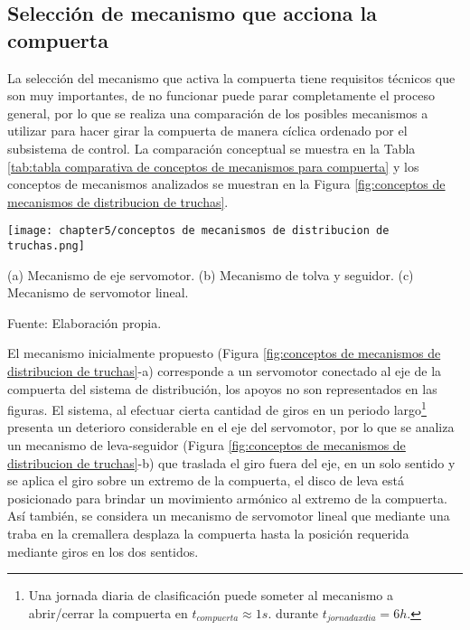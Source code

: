 \vspace{-2.0em}

\subsection{Selección de mecanismo que acciona la compuerta}
	
La selección del mecanismo que activa la compuerta tiene requisitos técnicos que son muy importantes, de no funcionar puede parar completamente el proceso general, por lo que se realiza una comparación de los posibles mecanismos a utilizar para hacer girar la compuerta de manera cíclica ordenado por el subsistema de control. La comparación conceptual se muestra en la Tabla \ref{tab:tabla comparativa de conceptos de mecanismos para compuerta} y los conceptos de mecanismos analizados se muestran en la Figura \ref{fig:conceptos de mecanismos de distribucion de truchas}.
	
\begin{myfigure}[H]
	\footnotesize\centering
	\texttt{[image: chapter5/conceptos de mecanismos de distribucion de truchas.png]}
	\caption[Conceptos de mecanismos de distribución de truchas]{(a) Mecanismo de eje servomotor. (b) Mecanismo de tolva y seguidor. (c) Mecanismo de servomotor lineal.}
	\begin{myflushcenter}
		Fuente: Elaboración propia.
	\end{myflushcenter}
	\label{fig:conceptos de mecanismos de distribucion de truchas}
\end{myfigure}
	
El mecanismo inicialmente propuesto (Figura \ref{fig:conceptos de mecanismos de distribucion de truchas}-a) corresponde a un servomotor conectado al eje de la compuerta del sistema de distribución, los apoyos no son representados en las figuras. El sistema, al efectuar cierta cantidad de giros en un periodo largo\footnote{Una jornada diaria de clasificación puede someter al mecanismo a abrir/cerrar la compuerta en $t_{compuerta}\approx1 s.$ durante $t_{jornadaxdia}=6 h.$} presenta un deterioro considerable en el eje del servomotor, por lo que se analiza un mecanismo de leva-seguidor (Figura \ref{fig:conceptos de mecanismos de distribucion de truchas}-b) que traslada el giro fuera del eje, en un solo sentido y se aplica el giro sobre un extremo de la compuerta, el disco de leva está posicionado para brindar un movimiento armónico al extremo de la compuerta. Así también, se considera un mecanismo de servomotor lineal que mediante una traba en la cremallera desplaza la compuerta hasta la posición requerida mediante giros en los dos sentidos.

